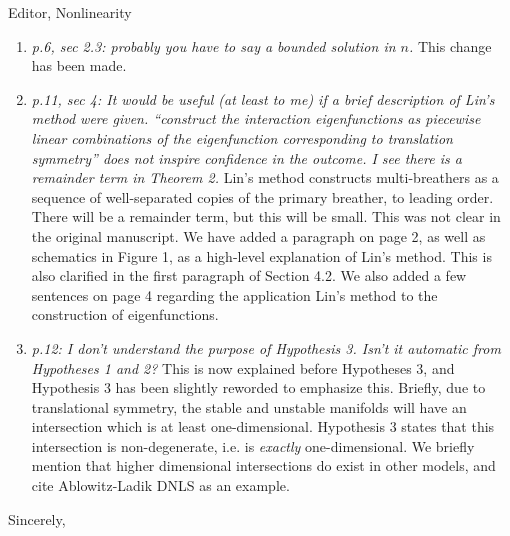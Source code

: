 \documentclass[11pt]{letter}
\begin{document}
\begin{letter}{Editor, Nonlinearity}
\begin{enumerate}
    \item \emph{p.6, sec 2.3: probably you have to say a bounded solution in $n$.} This change has been made.
    \vspace{4mm}

    \item \emph{p.11, sec 4: It would be useful (at least to me) if a brief description of Lin’s method were given. ``construct the interaction eigenfunctions as piecewise linear combinations of the eigenfunction corresponding to translation symmetry'' does not inspire confidence in the outcome. I see there is a remainder term in Theorem 2.} 
    Lin's method constructs multi-breathers as a sequence of well-separated copies of the primary breather, to leading order. There will be a remainder term, but this will be small. This was not clear in the original manuscript. We have added a paragraph on page 2, as well as schematics in Figure 1, as a high-level explanation of Lin's method. This is also clarified in the first paragraph of Section 4.2. We also added a few sentences on page 4 regarding the application Lin's method to the construction of eigenfunctions.
    \vspace{4mm}

    \item \emph{p.12: I don’t understand the purpose of Hypothesis 3. Isn’t it automatic from Hypotheses 1 and 2?}
    This is now explained before Hypotheses 3, and Hypothesis 3 has been slightly reworded to emphasize this. Briefly, due to translational symmetry, the stable and unstable manifolds will have an intersection which is at least one-dimensional. Hypothesis 3 states that this intersection is non-degenerate, i.e. is \emph{exactly} one-dimensional. We briefly mention that higher dimensional intersections do exist in other models, and cite Ablowitz-Ladik DNLS as an example.
\end{enumerate}


\closing{Sincerely,}

\end{letter}
\end{document}
